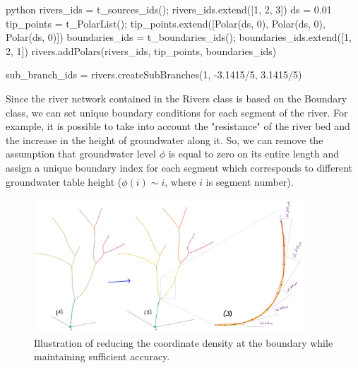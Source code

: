 \documentclass[]{pracamgr}
\begin{document}
      \begin{mintedbox}{python}
        rivers_ids = t_sources_ids(); rivers_ids.extend([1, 2, 3])
        ds = 0.01
        tip_points = t_PolarList(); tip_points.extend([Polar(ds, 0), Polar(ds, 0), Polar(ds, 0)])
        boundaries_ids = t_boundaries_ids(); boundaries_ids.extend([1, 2, 1])
        rivers.addPolars(rivers_ids, tip_points, boundaries_ids)
      
        sub_branch_ids = rivers.createSubBranches(1, -3.1415/5, 3.1415/5)\end{mintedbox}

      Since the river network contained in the Rivers class is based on the Boundary class, we can set unique boundary conditions for each segment of the river. For example, it is possible to take into account the "resistance" of the river bed and the increase in the height of groundwater along it. So, we can remove the assumption that groundwater level $\phi$ is equal to zero on its entire length and assign a unique boundary index for each segment which corresponds to different groundwater table height ($\phi(i) \sim i$, where $i$ is segment number).

      \begin{figure}[H]
        \centering
        \includegraphics[width=0.9\textwidth]{figs/tree_coarsening.jpg}        
        \caption{Illustration of reducing the coordinate density at the boundary while maintaining sufficient accuracy.}
        \label{tree_coarsening}
      \end{figure}
\end{document}
